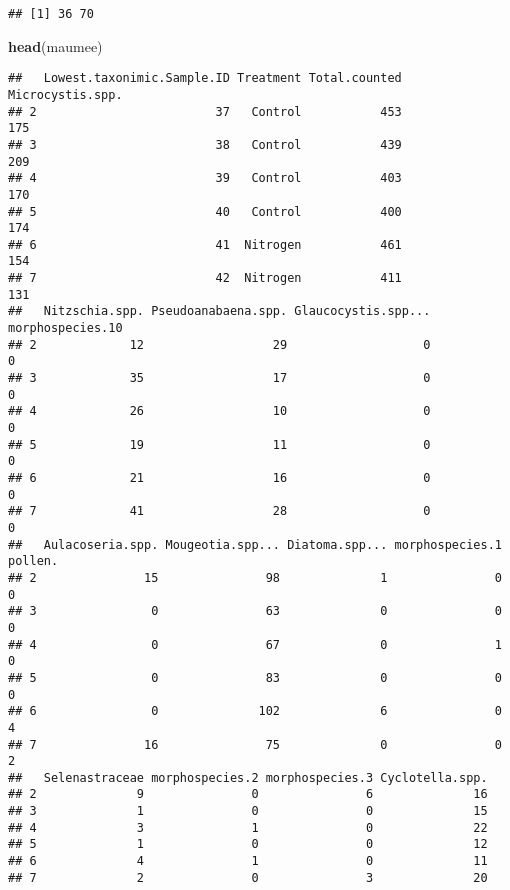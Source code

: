\documentclass[]{article}
\newenvironment{Shaded}{\begin{snugshade}}{\end{snugshade}}
\newcommand{\KeywordTok}[1]{\textcolor[rgb]{0.13,0.29,0.53}{\textbf{#1}}}
\newcommand{\NormalTok}[1]{#1}
\begin{document}
\begin{verbatim}
## [1] 36 70
\end{verbatim}

\begin{Shaded}
\begin{Highlighting}[]
\KeywordTok{head}\NormalTok{(maumee)}
\end{Highlighting}
\end{Shaded}

\begin{verbatim}
##   Lowest.taxonimic.Sample.ID Treatment Total.counted Microcystis.spp.
## 2                         37   Control           453              175
## 3                         38   Control           439              209
## 4                         39   Control           403              170
## 5                         40   Control           400              174
## 6                         41  Nitrogen           461              154
## 7                         42  Nitrogen           411              131
##   Nitzschia.spp. Pseudoanabaena.spp. Glaucocystis.spp... morphospecies.10
## 2             12                  29                   0                0
## 3             35                  17                   0                0
## 4             26                  10                   0                0
## 5             19                  11                   0                0
## 6             21                  16                   0                0
## 7             41                  28                   0                0
##   Aulacoseria.spp. Mougeotia.spp... Diatoma.spp... morphospecies.1 pollen.
## 2               15               98              1               0       0
## 3                0               63              0               0       0
## 4                0               67              0               1       0
## 5                0               83              0               0       0
## 6                0              102              6               0       4
## 7               16               75              0               0       2
##   Selenastraceae morphospecies.2 morphospecies.3 Cyclotella.spp.
## 2              9               0               6              16
## 3              1               0               0              15
## 4              3               1               0              22
## 5              1               0               0              12
## 6              4               1               0              11
## 7              2               0               3              20

\end{verbatim}
\end{document}
